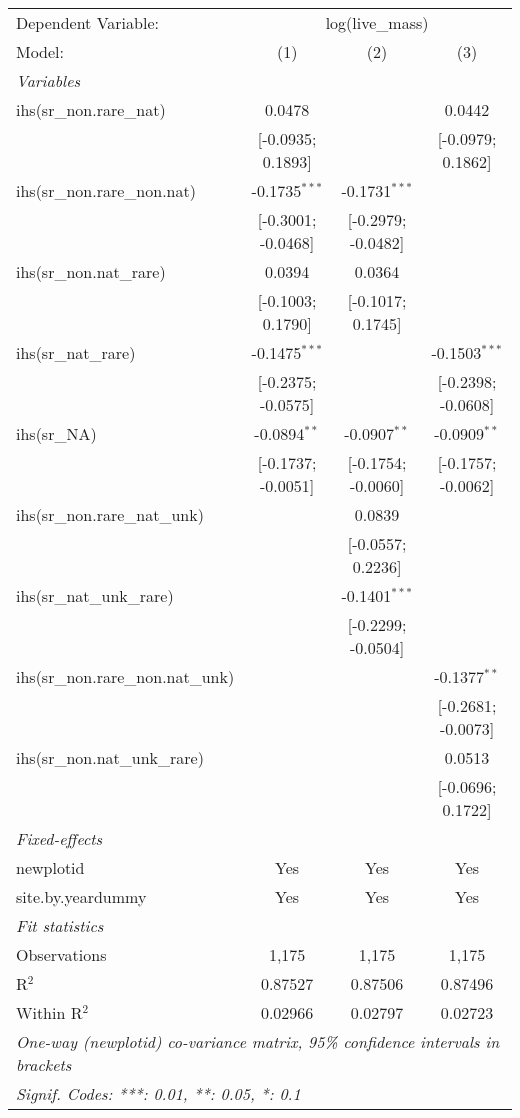 \begin{tabular}{lccc}
\tabularnewline\midrule\midrule
Dependent Variable:&\multicolumn{3}{c}{log(live\_mass)}\\
Model:&(1) & (2) & (3)\\
\midrule \emph{Variables}&   &   &  \\
ihs(sr\_non.rare\_nat)&0.0478 &    & 0.0442\\
  &[-0.0935; 0.1893] &    & [-0.0979; 0.1862]\\
ihs(sr\_non.rare\_non.nat)&-0.1735$^{***}$ & -0.1731$^{***}$ &   \\
  &[-0.3001; -0.0468] & [-0.2979; -0.0482] &   \\
ihs(sr\_non.nat\_rare)&0.0394 & 0.0364 &   \\
  &[-0.1003; 0.1790] & [-0.1017; 0.1745] &   \\
ihs(sr\_nat\_rare)&-0.1475$^{***}$ &    & -0.1503$^{***}$\\
  &[-0.2375; -0.0575] &    & [-0.2398; -0.0608]\\
ihs(sr\_NA)&-0.0894$^{**}$ & -0.0907$^{**}$ & -0.0909$^{**}$\\
  &[-0.1737; -0.0051] & [-0.1754; -0.0060] & [-0.1757; -0.0062]\\
ihs(sr\_non.rare\_nat\_unk)&   & 0.0839 &   \\
  &   & [-0.0557; 0.2236] &   \\
ihs(sr\_nat\_unk\_rare)&   & -0.1401$^{***}$ &   \\
  &   & [-0.2299; -0.0504] &   \\
ihs(sr\_non.rare\_non.nat\_unk)&   &    & -0.1377$^{**}$\\
  &   &    & [-0.2681; -0.0073]\\
ihs(sr\_non.nat\_unk\_rare)&   &    & 0.0513\\
  &   &    & [-0.0696; 0.1722]\\
\midrule \emph{Fixed-effects}&   &   &  \\
newplotid & Yes & Yes & Yes\\
site.by.yeardummy & Yes & Yes & Yes\\
\midrule \emph{Fit statistics}&  & & \\
Observations & 1,175&1,175&1,175\\
R$^2$ & 0.87527&0.87506&0.87496\\
Within R$^2$ & 0.02966&0.02797&0.02723\\
\midrule\midrule\multicolumn{4}{l}{\emph{One-way (newplotid) co-variance matrix, 95\% confidence intervals in brackets}}\\
\multicolumn{4}{l}{\emph{Signif. Codes: ***: 0.01, **: 0.05, *: 0.1}}\\
\end{tabular}


